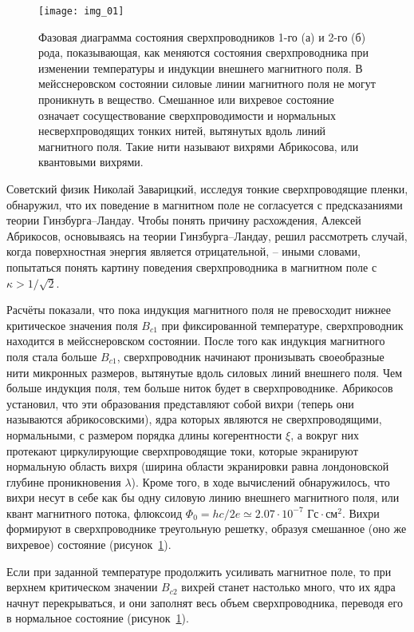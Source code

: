 \begin{figure}[h!]
    \center
    \texttt{[image: img\_01]}
    \caption{Фазовая диаграмма состояния сверхпроводников 1-го (а) и 
        2-го (б) рода, показывающая, как меняются состояния сверхпроводника 
        при изменении температуры и индукции внешнего магнитного поля. В 
        мейсснеровском состоянии силовые линии магнитного поля не могут 
        проникнуть в вещество. Смешанное или вихревое состояние означает 
        сосуществование сверхпроводимости и нормальных несверхпроводящих 
        тонких нитей, вытянутых вдоль линий магнитного поля. Такие нити 
        называют вихрями Абрикосова, или квантовыми вихрями.}
    \label{img:01}
\end{figure}

Советский физик Николай Заварицкий, исследуя тонкие сверхпроводящие пленки, 
обнаружил, что их поведение в магнитном поле не согласуется с предсказаниями 
теории Гинзбурга–Ландау. Чтобы понять причину расхождения, Алексей Абрикосов, 
основываясь на теории Гинзбурга–Ландау, решил рассмотреть случай, когда 
поверхностная энергия является отрицательной, -- иными словами, попытаться 
понять картину поведения сверхпроводника в магнитном поле с 
\( \kappa > 1/\sqrt{2} \).

Расчёты показали, что пока индукция магнитного поля не превосходит нижнее 
критическое значения поля \( B_{c1} \) при фиксированной температуре, 
сверхпроводник находится в мейсснеровском состоянии. После того как индукция 
магнитного поля стала больше \( B_{c1} \), сверхпроводник начинают пронизывать 
своеобразные нити микронных размеров, вытянутые вдоль силовых линий внешнего 
поля. Чем больше индукция поля, тем больше ниток будет в сверхпроводнике. 
Абрикосов установил, что эти образования представляют собой вихри (теперь они 
называются абрикосовскими), ядра которых являются не сверхпроводящими, 
нормальными, с размером порядка длины когерентности \( \xi \), а вокруг них 
протекают циркулирующие сверхпроводящие токи, которые экранируют нормальную 
область вихря (ширина области экранировки равна лондоновской глубине 
проникновения \( \lambda \)). Кроме того, в ходе вычислений обнаружилось, что 
вихри несут в себе как бы одну силовую линию внешнего магнитного поля, или 
квант магнитного потока, флюксоид 
\( \Phi_0 = hc/2e \simeq 2.07\cdot10^{-7} \text{ Гс}\cdot\text{см}^2 \). Вихри 
формируют в сверхпроводнике треугольную решетку, образуя смешанное (оно же 
вихревое) состояние (рисунок~\ref{img:01}).

Если при заданной температуре продолжить усиливать магнитное поле, то при 
верхнем критическом значении \( B_{c2} \) вихрей станет настолько много, что 
их ядра начнут перекрываться, и они заполнят весь объем сверхпроводника, 
переводя его в нормальное состояние (рисунок~\ref{img:01}). \cite{bib:net}

